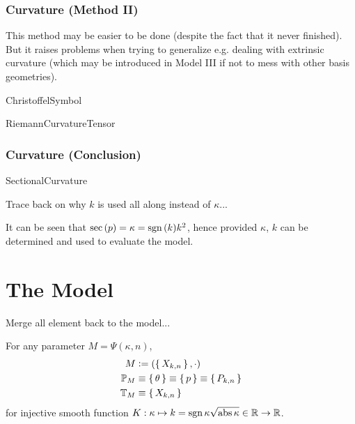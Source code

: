 \documentclass[stu, babel, american, biblatex, a4paper, draftall]{apa7}
\begin{document}
\subsubsection{Curvature (Method II)}
This method may be easier to be done
(despite the fact that it never finished).
But it raises problems when trying to generalize e.g. dealing with extrinsic curvature
(which may be introduced in Model III
if not to mess with other basis geometries).
\begin{ChristoffelSymbol}
    ChristoffelSymbol
\end{ChristoffelSymbol}
\begin{RiemannCurvatureTensor}
    RiemannCurvatureTensor
\end{RiemannCurvatureTensor}
\subsubsection{Curvature (Conclusion)}
\begin{SectionalCurvature}
    SectionalCurvature
\end{SectionalCurvature}
Trace back on why $k$ is used all along instead of $\kappa$...
\begin{CurvatureParameter}
    It can be seen that $\operatorname{sec}\left(p\right) = \kappa = \operatorname{sgn}{\left(k\right)}k^2$, hence provided $\kappa$, $k$ can be determined and used to evaluate the model.
\end{CurvatureParameter}
\section{The Model}
Merge all element back to the model...
\begin{ModelGroupElement}
    For any parameter $M=\Psi\left(\kappa, n\right)$,
    \begin{align*}
        M                   & \vcentcolon=\left(\set{X_{k,n}},\cdot\right)             \\
        \mathbb{P}_{M}          & \equiv\set{\theta}\equiv\set{p}\equiv\set{P_{k,n}} \\
        \mathbb{T}_{M} & \equiv\set{X_{k,n}}
    \end{align*}
    for injective smooth function $K:\kappa \mapsto k = \operatorname{sgn}{\kappa}\sqrt{\operatorname{abs}{\kappa}}\in\mathbb{R}\to\mathbb{R}$.
\end{ModelGroupElement}
\begin{ModelMetric}
\end{ModelMetric}
\begin{ModelGroupAssertion}
\end{ModelGroupAssertion}
\begin{ModelCurvatureAssertion}
\end{ModelCurvatureAssertion}
\end{document}
